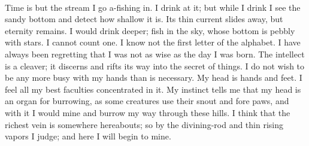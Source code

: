\documentclass[letterpaper,12pt]{article}
\begin{document}
\paragraph{} Time is but the stream I go a-fishing in. I drink at it; but while
I drink I see the sandy bottom and detect how shallow it is. Its thin current
slides away, but eternity remains. I would drink deeper; fish in the sky, whose
bottom is pebbly with stars. I cannot count one. I know not the first letter of
the alphabet.  I have always been regretting that I was not as wise as the day
I was born. The intellect is a cleaver; it discerns and rifts its way into the
secret of things.  I do not wish to be any more busy with my hands than is
necessary. My head is hands and feet. I feel all my best faculties concentrated
in it. My instinct tells me that my head is an organ for burrowing, as some
creatures use their snout and fore paws, and with it I would mine and burrow my
way through these hills. I think that the richest vein is somewhere hereabouts;
so by the divining-rod and thin rising vapors I judge; and here I will begin to
mine.
\end{document}
